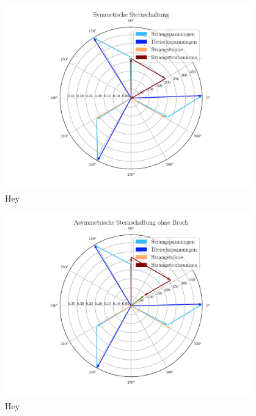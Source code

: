 \documentclass[12pt,english,ngerman]{scrartcl}
\begin{document}
\begin{figure}[H]
	\begin{center}
		\includegraphics[width = 0.95\textwidth]{figures/zeigerSternSym.pdf}
	\end{center}
	\caption[Stromabhängige Leistungskurve einer Glühbirne]{ Hey
	}\label{fig:zeigerSternSym}
\end{figure}

\begin{figure}[H]
	\begin{center}
		\includegraphics[width = 0.95\textwidth]{figures/zeigerSternAsymOhneBruch.pdf}
	\end{center}
	\caption[Stromabhängige Leistungskurve einer Glühbirne]{ Hey
	}\label{fig:zeigerSternAsymOhneBruch}
\end{figure}
\end{document}
